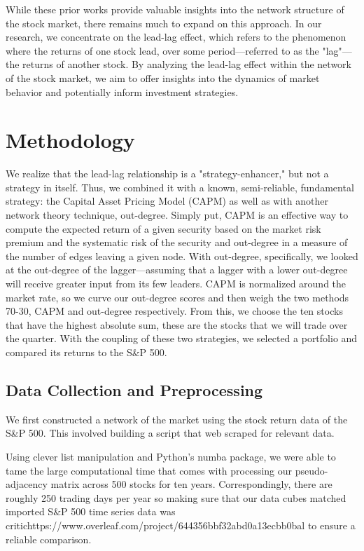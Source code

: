 \documentclass{article}
\begin{document}
While these prior works provide valuable insights into the network structure of the stock market, there remains much to expand on this approach. In our research, we concentrate on the lead-lag effect, which refers to the phenomenon where the returns of one stock lead, over some period—referred to as the "lag"—the returns of another stock. By analyzing the lead-lag effect within the network of the stock market, we aim to offer insights into the dynamics of  market behavior and potentially inform investment strategies.
\section{Methodology}
We realize that the lead-lag relationship is a "strategy-enhancer," but not a strategy in itself. Thus, we combined it with a known, semi-reliable, fundamental strategy: the  Capital Asset Pricing Model (CAPM) as well as with another network theory technique, out-degree. Simply put, CAPM is an effective way to compute the expected return of a given security based on the market risk premium and the systematic risk of the security and out-degree in a measure of the number of edges leaving a given node. With out-degree, specifically, we looked at the out-degree of the lagger—assuming that a lagger with a lower out-degree will receive greater input from its few leaders. CAPM is normalized around the market rate, so we curve our out-degree scores and then weigh the two methods 70-30, CAPM and out-degree respectively. From this, we choose the ten stocks that have the highest absolute sum, these are the stocks that we will trade over the quarter.
With the coupling of these two strategies, we selected a portfolio and compared its returns to the S\&P 500.
\subsection{Data Collection and Preprocessing}
We first constructed a network of the market using the stock return data of the S\&P 500. This involved building a script that web scraped for relevant data.

Using clever list manipulation and Python's  {\selectfont
numba} package, we were able to tame the large computational time that comes with processing our pseudo-adjacency matrix across 500 stocks for ten years. Correspondingly, there are roughly 250 trading days per year so making sure that our data cubes matched imported S$\&$P 500 time series data was critichttps://www.overleaf.com/project/644356bbf32abd0a13ecbb0bal to ensure a reliable comparison.
\end{document}
